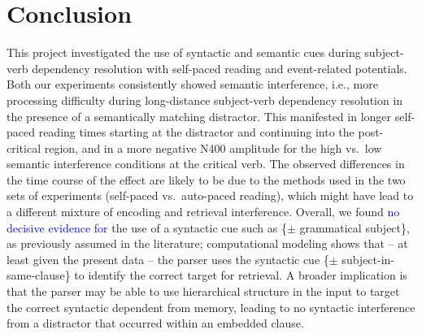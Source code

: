 \documentclass[a4paper, man, floatsintext]{apa7}
\begin{document}
\section{Conclusion}
This project investigated the use of  syntactic and semantic cues during subject-verb dependency resolution with self-paced reading and event-related potentials.  Both our experiments consistently showed semantic interference, i.e., more processing difficulty during long-distance subject-verb dependency resolution in the presence of a semantically matching distractor. This manifested in longer self-paced reading times starting at the distractor and continuing into the post-critical region, and in a more negative N400 amplitude for the high vs.\ low semantic interference conditions at the critical verb. The observed differences in the time course of the effect are likely to be due to the methods used in the two sets of experiments (self-paced vs.\ auto-paced reading), which might have lead to a different mixture of encoding and retrieval interference. Overall, we found \textcolor{blue}{no decisive evidence for} the use of a syntactic cue such as \{$\pm$ grammatical subject\}, as previously assumed in the literature; computational modeling shows that -- at least given the present data -- the parser uses the syntactic cue  \{$\pm$ subject-in-same-clause\}  to identify the correct target for retrieval.  A broader implication is that the parser may be able to use hierarchical structure in the input to target the correct syntactic dependent from memory, leading to no syntactic interference from a distractor that occurred within an embedded clause.

\newpage
\printbibliography
\end{document}
